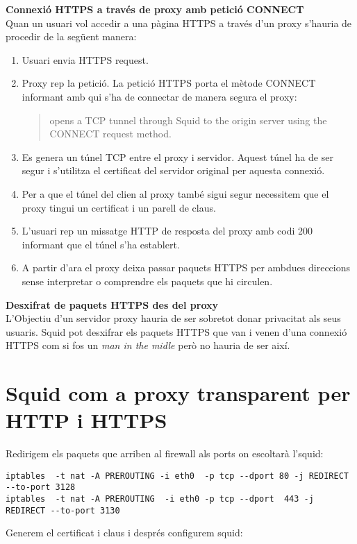 \documentclass[a4paper]{article}
\begin{document}
\textbf{Connexió HTTPS a trav\'es de proxy amb petició CONNECT}\\
Quan un usuari vol accedir a una pàgina HTTPS a trav\'es d'un proxy s'hauria de procedir de la següent manera:
\begin{enumerate}
	\item Usuari envia HTTPS request.
	\item Proxy rep la petició. La petició HTTPS porta el mètode CONNECT informant amb qui s'ha de connectar de manera segura el proxy:
		\begin{quote}
		opens a TCP tunnel through Squid to the origin server using the CONNECT request method.\cite{SQUID_HTTPS}
		\end{quote}
	\item Es genera un túnel TCP entre el proxy i servidor. Aquest túnel ha de ser segur i s'utilitza el certificat del servidor original per aquesta connexió.
	\item Per a que el túnel del clien al proxy tamb\'e sigui segur necessitem que el proxy tingui un certificat i un parell de claus.
	\item L'usuari rep un missatge HTTP de resposta del proxy amb codi 200 informant que el túnel s'ha establert.
	\item A partir d'ara el proxy deixa passar paquets HTTPS per ambdues direccions sense interpretar o comprendre els paquets que hi circulen.
\end{enumerate}
\textbf{Desxifrat de paquets HTTPS des del proxy}\\
L'Objectiu d'un servidor proxy hauria de ser sobretot donar privacitat als seus usuaris. Squid pot desxifrar els paquets HTTPS que van i venen d'una connexió HTTPS com si fos un \textit{man in the midle} però no hauria de ser així.

\section{Squid com a proxy transparent per HTTP i HTTPS}

Redirigem els paquets que arriben al firewall als ports on escoltarà l'squid:

\begin{verbatim}
iptables  -t nat -A PREROUTING -i eth0  -p tcp --dport 80 -j REDIRECT --to-port 3128 
iptables  -t nat -A PREROUTING  -i eth0 -p tcp --dport  443 -j REDIRECT --to-port 3130 
\end{verbatim}
Generem el certificat i claus i despr\'es configurem squid:
\end{document}
